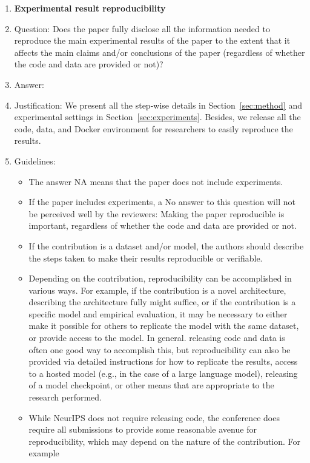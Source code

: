 \begin{enumerate}
    \item {\bf Experimental result reproducibility}
    \item[] Question: Does the paper fully disclose all the information needed to reproduce the main experimental results of the paper to the extent that it affects the main claims and/or conclusions of the paper (regardless of whether the code and data are provided or not)?
    \item[] Answer: \answerYes{} %
    \item[] Justification: We present all the step-wise details in Section~\ref{sec:method} and experimental settings in Section~\ref{sec:experiments}. Besides, we  release all the code, data, and Docker environment for researchers to easily reproduce the results.%
    \item[] Guidelines:
    \begin{itemize}
        \item The answer NA means that the paper does not include experiments.
        \item If the paper includes experiments, a No answer to this question will not be perceived well by the reviewers: Making the paper reproducible is important, regardless of whether the code and data are provided or not.
        \item If the contribution is a dataset and/or model, the authors should describe the steps taken to make their results reproducible or verifiable. 
        \item Depending on the contribution, reproducibility can be accomplished in various ways. For example, if the contribution is a novel architecture, describing the architecture fully might suffice, or if the contribution is a specific model and empirical evaluation, it may be necessary to either make it possible for others to replicate the model with the same dataset, or provide access to the model. In general. releasing code and data is often one good way to accomplish this, but reproducibility can also be provided via detailed instructions for how to replicate the results, access to a hosted model (e.g., in the case of a large language model), releasing of a model checkpoint, or other means that are appropriate to the research performed.
        \item While NeurIPS does not require releasing code, the conference does require all submissions to provide some reasonable avenue for reproducibility, which may depend on the nature of the contribution. For example

\end{itemize}
\end{enumerate}
